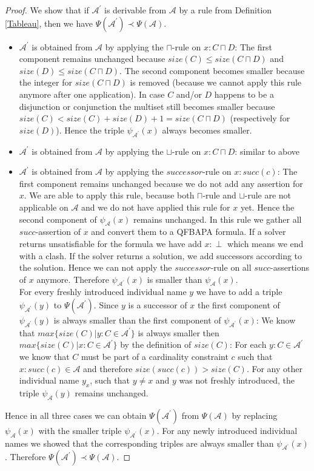 \documentclass{book}
\theoremstyle{break}
\theoremstyle{definition}
\begin{document}
\begin{proof}
We show that if $\mathcal{A}^\prime$ is derivable from $\mathcal{A}$ by a rule from Definition \ref{Tableau}, then we have $\Psi(\mathcal{A}^\prime)\prec \Psi(\mathcal{A})$.\\
\begin{itemize}
\item $\mathcal{A}^\prime$ is obtained from $\mathcal{A}$ by applying the $\sqcap$-rule on $x:C\sqcap D$: The first component remains unchanged because $size(C)\leq size(C\sqcap D)$ and $size(D)\leq size(C\sqcap D)$. The second component becomes smaller because the integer for $size(C\sqcap D)$ is removed (because we cannot apply this rule anymore after one application). In case $C$ and/or $D$ happens to be a disjunction or conjunction the multiset still becomes smaller because $size(C)< size(C)+size(D)+1=size(C\sqcap D)$ (respectively for $size(D)$). Hence the triple $\psi_{\mathcal{A}^\prime}(x)$ always becomes smaller.
\item $\mathcal{A}^\prime$ is obtained from $\mathcal{A}$ by applying the $\sqcup$-rule on $x:C\sqcap D$: similar to above
\item $\mathcal{A}^\prime$ is obtained from $\mathcal{A}$ by applying the $successor$-rule on $x:succ(c)$: The first component remains unchanged because we do not add any assertion for $x$. We are able to apply this rule, because both $\sqcap$-rule and $\sqcup$-rule are not applicable on $\mathcal{A}$ and we do not have applied this rule for $x$ yet. Hence the second component of $\psi_\mathcal{A}(x)$ remains unchanged. In this rule we gather all $succ$-assertion of $x$ and convert them to a QFBAPA formula. If a solver returns unsatisfiable for the formula we have add $x:\perp$ which means we end with a clash. If the solver returns a solution, we add successors according to the solution. Hence we can not apply the $successor$-rule on all $succ$-assertions of $x$ anymore. Therefore $\psi_{\mathcal{A}^\prime}(x)$ is smaller than $\psi_\mathcal{A}(x)$.\\
For every freshly introduced individual name $y$ we have to add a triple $\psi_{\mathcal{A}^\prime}(y)$ to $\Psi(\mathcal{A}^\prime)$. Since $y$ is a successor of $x$ the first component of $\psi_{\mathcal{A}^\prime}(y)$ is always smaller than the first component of $\psi_{\mathcal{A}^\prime}(x)$: We know that $max\{size(C)|y:C\in\mathcal{A}^\prime\}$ is always smaller then $max\{size(C)|x:C\in\mathcal{A}^\prime\}$ by the definition of $size(C)$: For each $y:C\in\mathcal{A}^\prime$ we know that $C$ must be part of a cardinality constraint $c$ such that $x:succ(c)\in\mathcal{A}$ and therefore $size(succ(c))>size(C)$. For any other individual name $y_x$, such that $y\neq x$ and $y$ was not freshly introduced, the triple $\psi_\mathcal{A}(y)$ remains unchanged.
\end{itemize}
 Hence in all three cases we can obtain $\Psi(\mathcal{A}^\prime)$ from $\Psi(\mathcal{A})$ by replacing $\psi_\mathcal{A}(x)$ with the smaller triple $\psi_{\mathcal{A}^\prime}(x)$. For any newly introduced individual names we showed that the corresponding triples are always smaller than $\psi_{\mathcal{A}^\prime}(x)$. Therefore $\Psi(\mathcal{A}^\prime)\prec\Psi(\mathcal{A})$.
\end{proof}
\end{document}

